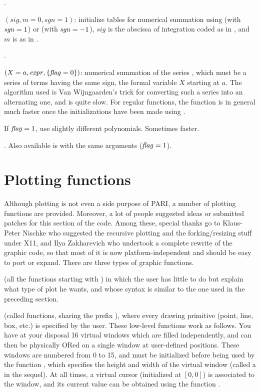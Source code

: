 .

$(sig,{m=0},{sgn=1})$: initialize tables for numerical
summation using  (with $\hbox{\it sgn\/}=1$) or  (with
$\hbox{\it sgn\/}=-1$), $sig$ is the abscissa of integration coded as in ,
and $m$ is as in .

.

$(X=a,\hbox{\it expr\/},\{\hbox{\it f\kern0pt lag\/}=0\})$: numerical summation of the
series , which must be a series of terms having the same sign,
the formal
variable $X$ starting at $a$. The algorithm used is Van Wijngaarden's trick
for converting such a series into an alternating one, and is quite slow. For
regular functions, the function  is in general much faster once the
initializations have been made using .

If $\hbox{\it f\kern0pt lag\/}=1$, use slightly different polynomials. Sometimes faster.

. Also
available is  with the same arguments ($\hbox{\it f\kern0pt lag\/} = 1$).

\section{Plotting functions}

  Although plotting is not even a side purpose of PARI, a number of plotting
functions are provided. Moreover, a lot of people suggested ideas or submitted
patches for this section of the code. Among these, special thanks go to
Klaus-Peter Nischke who suggested the recursive plotting and the
forking/resizing stuff under X11, and Ilya Zakharevich who undertook a
complete rewrite of the graphic code, so that most of it is now
platform-independent and should be easy to port or expand. There are three
types of graphic functions.

 (all the functions starting with ) in which the user has little to
do but explain what type of plot he wants, and whose syntax is similar to the
one used in the preceding section.

 (called  functions,
sharing the prefix ), where every drawing primitive (point, line,
box, etc.) is specified by the user. These low-level functions work as
follows. You have at your disposal 16 virtual windows which are filled
independently, and can then be physically ORed on a single window at
user-defined positions. These windows are numbered from 0 to 15, and must be
initialized before being used by the function , which specifies
the height and width of the virtual window (called a  in the
sequel). At all times, a virtual cursor (initialized at $[0,0]$) is associated
to the window, and its current value can be obtained using the function
.

